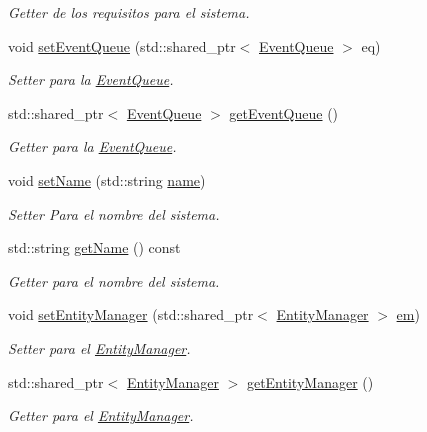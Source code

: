 \begin{DoxyCompactItemize}
\begin{DoxyCompactList}\small\item\em Getter de los requisitos para el sistema. \end{DoxyCompactList}\item 
void \hyperlink{classant_1_1_system_a1effe9f0e5615e516a34be02d5895434}{set\+Event\+Queue} (std\+::shared\+\_\+ptr$<$ \hyperlink{classant_1_1_event_queue}{Event\+Queue} $>$ eq)
\begin{DoxyCompactList}\small\item\em Setter para la \hyperlink{classant_1_1_event_queue}{Event\+Queue}. \end{DoxyCompactList}\item 
std\+::shared\+\_\+ptr$<$ \hyperlink{classant_1_1_event_queue}{Event\+Queue} $>$ \hyperlink{classant_1_1_system_ac3e2bbbdb622276d194ad3a687d8e4f1}{get\+Event\+Queue} ()
\begin{DoxyCompactList}\small\item\em Getter para la \hyperlink{classant_1_1_event_queue}{Event\+Queue}. \end{DoxyCompactList}\item 
void \hyperlink{classant_1_1_system_a231f9fc93b55ee67deb9597ae6be13ba}{set\+Name} (std\+::string \hyperlink{classant_1_1_system_a60b3c00a760a3b4947ab1f1fc534a5b2}{name})
\begin{DoxyCompactList}\small\item\em Setter Para el nombre del sistema. \end{DoxyCompactList}\item 
std\+::string \hyperlink{classant_1_1_system_a52a559b2c3ddbec5c846df1badd7f7f8}{get\+Name} () const 
\begin{DoxyCompactList}\small\item\em Getter para el nombre del sistema. \end{DoxyCompactList}\item 
void \hyperlink{classant_1_1_system_a1f983382d142ea697f1811f7f6f6ab17}{set\+Entity\+Manager} (std\+::shared\+\_\+ptr$<$ \hyperlink{classant_1_1_entity_manager}{Entity\+Manager} $>$ \hyperlink{classant_1_1_system_a5661d872ff769be150bd4e9a9552f6b9}{em})
\begin{DoxyCompactList}\small\item\em Setter para el \hyperlink{classant_1_1_entity_manager}{Entity\+Manager}. \end{DoxyCompactList}\item 
std\+::shared\+\_\+ptr$<$ \hyperlink{classant_1_1_entity_manager}{Entity\+Manager} $>$ \hyperlink{classant_1_1_system_adaad2087de7fc71924cfb5b134014b0a}{get\+Entity\+Manager} ()
\begin{DoxyCompactList}\small\item\em Getter para el \hyperlink{classant_1_1_entity_manager}{Entity\+Manager}. \end{DoxyCompactList}\end{DoxyCompactItemize}
